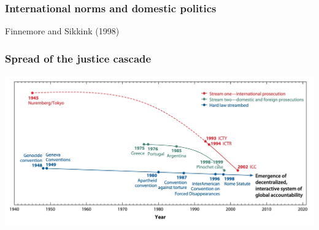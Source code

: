 \documentclass[aspectratio=43]{beamer}
\begin{document}
\begin{frame}
\frametitle{International norms and domestic politics}
\centering

Finnemore and Sikkink (1998)

\end{frame}


\begin{frame}
\frametitle{Spread of the justice cascade}
\centering

\includegraphics[width = \textwidth]{img/justice_cascade}

\end{frame}
\end{document}
